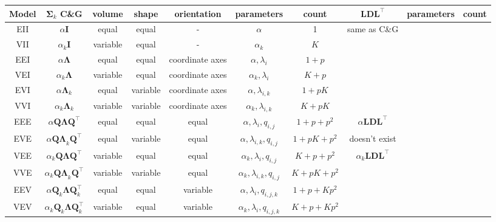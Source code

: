 \begin{table}[!htb]
    \centering
{}
{
    \begin{tabular}{| c | c c c c c c | c c c |}
        \hline
        Model & $\pmb{\Sigma}_k$ C\&G & volume & shape & orientation & parameters & count & $ \pmb{LDL}^\top $ & parameters & count \\
        \hline

        EII    & $ \alpha \pmb{I} $ & equal & equal & - & $ \alpha $ & 1 & same as C\&G & & \\
        VII    & $ \alpha_k \pmb{I} $         & variable & equal & - & $ \alpha_k $ & $ K $ & & & \\
        EEI    & $ \alpha \pmb{\Lambda} $     & equal & equal & coordinate axes & $ \alpha, \lambda_i $ & $ 1+p $ & & & \\
        VEI    & $ \alpha_k \pmb{\Lambda} $ & variable & equal & coordinate axes & $ \alpha_k, \lambda_{i}$ & $ K+p $ & & & \\
        EVI    & $ \alpha \pmb{\Lambda}_k $ &equal & variable & coordinate axes & $ \alpha, \lambda_{i,k} $ & $ 1+pK $ & & & \\
        VVI    & $ \alpha_k \pmb{\Lambda}_k $ & variable & variable & coordinate axes & $ \alpha_k, \lambda_{i,k} $ & $ K+pK $ & & & \\
        \hline
        EEE    & $ \alpha \pmb{Q \Lambda Q}^\top $ &equal & equal & equal & $ \alpha, \lambda_{i}, q_{i,j} $ & $ 1+p+p^2 $ & $ \alpha \pmb{LDL}^{\top} $ & & \\
        \hline
        EVE    & $ \alpha \pmb{Q \Lambda}_k \pmb{Q}^\top $ &equal & variable & equal & $ \alpha, \lambda_{i,k}, q_{i,j} $ & $ 1+pK+p^2 $ & doesn't exist & & \\
        \hline
        VEE    & $ \alpha_k \pmb{Q \Lambda Q}^\top $ & variable & equal & equal & $ \alpha_k, \lambda_{i}, q_{i,j} $ & $ K+p+p^2 $ & $ \alpha_k \pmb{LDL}^\top $ & & \\
        \hline
        VVE    & $ \alpha_k \pmb{Q \Lambda}_k \pmb{Q}^\top $ &variable & variable & equal & $ \alpha_k, \lambda_{i,k}, q_{i,j} $ & $ K+pK+p^2 $ & & & \\
        EEV    & $ \alpha \pmb{Q}_k \pmb{\Lambda} \pmb{Q}_k^\top $ &equal & equal & variable & $ \alpha, \lambda_{i}, q_{i,j,k} $ & $ 1+p+Kp^2 $ &    & & \\
        VEV    & $ \alpha_k \pmb{Q}_k \pmb{\Lambda} \pmb{Q}_k^\top $ &variable & equal & variable & $ \alpha_k, \lambda_{i}, q_{i,j,k} $ & $ K+p+Kp^2 $ & & & \\

\end{tabular}}
\end{table}
